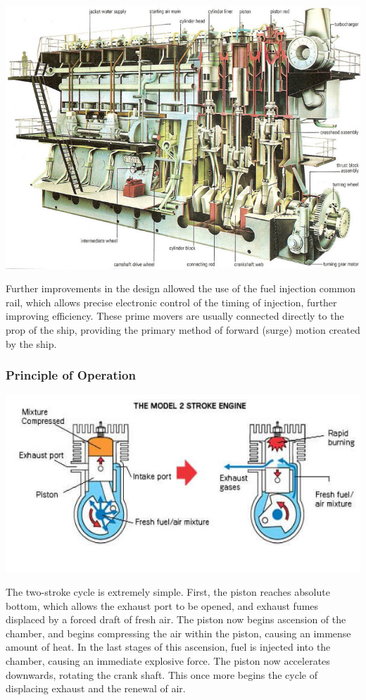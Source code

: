 \documentclass[11pt,a4paper]{article}
\begin{document}
\begin{center}
\includegraphics[width=15cm]{bigboy.jpg}
\end{center}

Further improvements in the design allowed the use of the fuel injection common rail, which allows precise electronic control of the timing of injection, further improving efficiency. These prime movers are usually connected directly to the prop of the ship, providing the primary method of forward (surge) motion created by the ship.\cite{m1}
\subsubsection{Principle of Operation}
\begin{center}
\includegraphics[width=14cm]{2stroke.jpg}
\end{center}
The two-stroke cycle is extremely simple. First, the piston reaches absolute bottom, which allows the exhaust port to be opened, and exhaust fumes displaced by a forced draft of fresh air. The piston now begins ascension of the chamber, and begins compressing the air within the piston, causing an immense amount of heat. In the last stages of this ascension, fuel is injected into the chamber, causing an immediate explosive force. The piston now accelerates downwards, rotating the crank shaft. This once more begins the cycle of displacing exhaust and the renewal of air.
\end{document}
